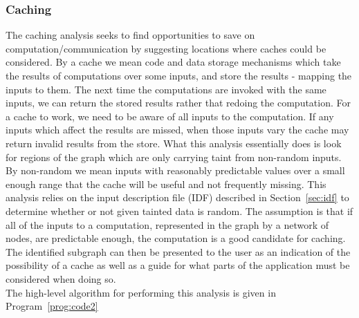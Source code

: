 \documentclass[msc,oneside]{ubcthesis}
\begin{document}
\subsubsection{Caching}
The caching analysis seeks to find opportunities to save on computation/communication by suggesting locations where caches could be considered. By a cache we mean code and data storage mechanisms which take the results of computations over some inputs, and store the results - mapping the inputs to them. The next time the computations are invoked with the same inputs, we can return the stored results rather that redoing the computation. For a cache to work, we need to be aware of all inputs to the computation. If any inputs which affect the results are missed, when those inputs vary the cache may return invalid results from the store. What this analysis essentially does is look for regions of the graph which are only carrying taint from non-random inputs. By non-random we mean inputs with reasonably predictable values over a small enough range that the cache will be useful and not frequently missing. This analysis relies on the input description file (IDF) described in Section~\ref{sec:idf} to determine whether or not given tainted data is random. The assumption is that if all of the inputs to a computation, represented in the graph by a network of nodes, are predictable enough, the computation is a good candidate for caching. The identified subgraph can then be presented to the user as an indication of the possibility of a cache as well as a guide for what parts of the application must be considered when doing so.\\

The high-level algorithm for performing this analysis is given in Program~\ref{prog:code2}
\end{document}
